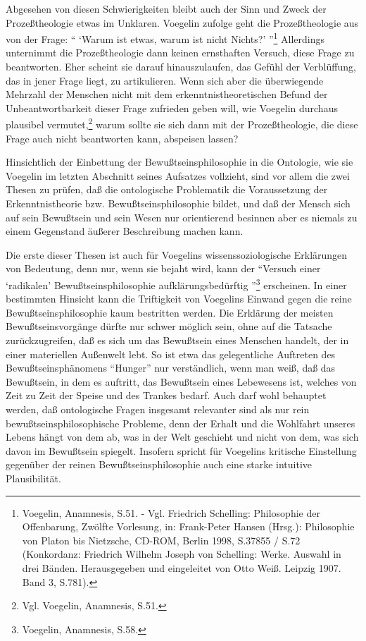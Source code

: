 Abgesehen von diesen Schwierigkeiten bleibt auch der Sinn und Zweck der
Prozeßtheologie etwas im Unklaren. Voegelin zufolge geht die
Prozeßtheologie aus von der Frage: "` `Warum ist etwas, warum ist nicht
Nichts?'  "'\footnote{Voegelin, Anamnesis, S.51. - Vgl. Friedrich
  Schelling: Philosophie der Offenbarung, Zwölfte Vorlesung, in:
  Frank-Peter Hansen (Hrsg.): Philosophie von Platon bis Nietzsche,
  CD-ROM, Berlin 1998, S.37855 / S.72 (Konkordanz: Friedrich Wilhelm
  Joseph von Schelling: Werke. Auswahl in drei Bänden. Herausgegeben und
  eingeleitet von Otto Weiß. Leipzig 1907.  Band 3, S.781).} Allerdings
unternimmt die Prozeßtheologie dann keinen ernsthaften Versuch, diese
Frage zu beantworten. Eher scheint sie darauf hinauszulaufen, das Gefühl
der Verblüffung, das in jener Frage liegt, zu artikulieren. Wenn sich
aber die überwiegende Mehrzahl der Menschen nicht mit dem
erkenntnistheoretischen Befund der Unbeantwortbarkeit dieser Frage
zufrieden geben will, wie Voegelin durchaus plausibel
vermutet,\footnote{Vgl.  Voegelin, Anamnesis, S.51.} warum sollte sie
sich dann mit der Prozeßtheologie, die diese Frage auch nicht
beantworten kann, abspeisen lassen?

Hinsichtlich der Einbettung der Bewußtseinsphilosophie in die Ontologie,
wie sie Voegelin im letzten Abschnitt seines Aufsatzes vollzieht, sind
vor allem die zwei Thesen zu prüfen, daß die ontologische Problematik
die Voraussetzung der Erkenntnistheorie bzw. Bewußtseinsphilosophie
bildet, und daß der Mensch sich auf sein Bewußtsein und sein Wesen nur
orientierend besinnen aber es niemals zu einem Gegenstand äußerer
Beschreibung machen kann.

Die erste dieser Thesen ist auch für Voegelins wissenssoziologische
Erklärungen von Bedeutung, denn nur, wenn sie bejaht wird, kann der "`Versuch
einer `radikalen' Bewußtseinsphilosophie aufklärungsbedürftig
"'\footnote{Voegelin, Anamnesis, S.58.} erscheinen. In einer bestimmten
Hinsicht kann die Triftigkeit von Voegelins Einwand gegen die reine
Bewußtseinsphilosophie kaum bestritten werden. Die Erklärung der meisten
Bewußtseinsvorgänge dürfte nur schwer möglich sein, ohne auf die Tatsache
zurückzugreifen, daß es sich um das Bewußtsein eines Menschen handelt, der in
einer materiellen Außenwelt lebt. So ist etwa das gelegentliche Auftreten des
Bewußtseinsphänomens "`Hunger"' nur verständlich, wenn man weiß, daß das
Bewußtsein, in dem es auftritt, das Bewußtsein eines Lebewesens ist, welches
von Zeit zu Zeit der Speise und des Trankes bedarf. Auch darf wohl behauptet
werden, daß ontologische Fragen insgesamt relevanter sind als nur rein
bewußtseinsphilosophische Probleme, denn der Erhalt und die Wohlfahrt unseres
Lebens hängt von dem ab, was in der Welt geschieht und nicht von dem, was sich
davon im Bewußtsein spiegelt. Insofern spricht für Voegelins kritische
Einstellung gegenüber der reinen Bewußtseinsphilosophie auch eine starke
intuitive Plausibilität.


